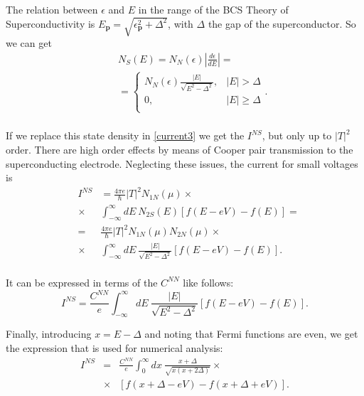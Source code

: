 \documentclass[twocolumn, twoside,a4paper,10pt]{article}
\begin{document}
The relation between $\epsilon$ and $E$ in the range of the BCS Theory of Superconductivity is $E_{\mathbf{p}} = \sqrt{\epsilon_{\mathbf{p}}^2 + \Delta^2}$, with $\Delta$ the gap of the superconductor. So we can get
\begin{eqnarray}\label{ns}
&&N_S(E) = N_N(\epsilon) \left | \frac{d\epsilon}{dE} \right | = 
	\nonumber \\
&& = \left\{ 
\begin{array}{ll} 
N_N(\epsilon)\frac{|E|}{\sqrt{E^2-\Delta^2}},	&	|E| > \Delta 	\\ 
0,								& 	|E| \geq \Delta	\\
\end{array}
\right..
	\nonumber \\
\end{eqnarray}

If we replace this state density in \eqref{current3} we get the $I^{NS}$, but only up to $|T|^2$ order. There are high order effects by means of Cooper pair transmission to the superconducting electrode. Neglecting these issues, the current for small voltages is
\begin{eqnarray}\label{ins_previous}
&I^{NS}& = \frac{4\pi e}{\hbar} |T|^2 N_{1N}(\mu) \times
		\nonumber \\
		&\times& \int_{-\infty}^{\infty} dE\ N_{2S}(E) [f(E-eV)-f(E)] =
		\nonumber \\
		&=& \frac{4\pi e}{\hbar} |T|^2 N_{1N}(\mu) N_{2N}(\mu) \times
		\nonumber \\
		&\times& \int_{-\infty}^{\infty} dE\ \frac{|E|}{\sqrt{E^2-\Delta^2}} [f(E-eV)-f(E)].
		\nonumber \\
\end{eqnarray}

It can be expressed in terms of the $C^{NN}$ like follows:
\begin{equation}\label{ins}
I^{NS} = \frac{C^{NN}}{e} \int_{-\infty}^{\infty} dE\ \frac{|E|}{\sqrt{E^2-\Delta^2}} [f(E-eV)-f(E)].
\end{equation}

Finally, introducing $x=E-\Delta$ and noting that Fermi functions are even, we get the expression that is used for numerical analysis:
\begin{eqnarray}\label{ins_numerical}
I^{NS} &=& \frac{C^{NN}}{e} \int_{0}^{\infty} dx\ \frac{x+\Delta}{\sqrt{x(x+2 \Delta)}} \times
		\nonumber \\
		&\times& [f(x+ \Delta-eV)-f(x+ \Delta +eV)].
		\nonumber \\
\end{eqnarray}
\end{document}
